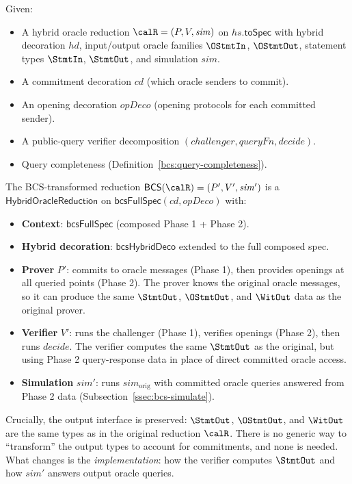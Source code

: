 \begin{definition}
  \label{bcs:bcs-reduction}
  Given:
  \begin{itemize}
    \item A hybrid oracle reduction $\calR = (P, V, \mathit{sim})$ on
      $\mathit{hs}.\mathsf{toSpec}$ with hybrid decoration $\mathit{hd}$,
      input/output oracle families $\OStmtIn$, $\OStmtOut$,
      statement types $\StmtIn$, $\StmtOut$,
      and simulation $\mathit{sim}$.
    \item A commitment decoration $\mathit{cd}$ (which oracle senders to
      commit).
    \item An opening decoration $\mathit{opDeco}$ (opening protocols for
      each committed sender).
    \item A public-query verifier decomposition
      $(\mathit{challenger}, \mathit{queryFn}, \mathit{decide})$.
    \item Query completeness (Definition~\ref{bcs:query-completeness}).
  \end{itemize}
  The BCS-transformed reduction
  $\mathsf{BCS}(\calR) = (P', V', \mathit{sim}')$ is a
  $\mathsf{HybridOracleReduction}$ on
  $\mathsf{bcsFullSpec}(\mathit{cd}, \mathit{opDeco})$ with:
  \begin{itemize}
    \item \textbf{Context}: $\mathsf{bcsFullSpec}$ (composed Phase 1 + Phase 2).
    \item \textbf{Hybrid decoration}: $\mathsf{bcsHybridDeco}$ extended to
      the full composed spec.
    \item \textbf{Prover} $P'$: commits to oracle messages (Phase 1),
      then provides openings at all queried points (Phase 2).
      The prover knows the original oracle messages, so it can produce the
      same $\StmtOut$, $\OStmtOut$, and $\WitOut$ data as the original
      prover.
    \item \textbf{Verifier} $V'$: runs the challenger (Phase 1), verifies
      openings (Phase 2), then runs $\mathit{decide}$.
      The verifier computes the same $\StmtOut$ as the original, but
      using Phase 2 query-response data in place of direct committed oracle
      access.
    \item \textbf{Simulation} $\mathit{sim}'$:
      runs $\mathit{sim}_{\mathrm{orig}}$ with committed oracle queries
      answered from Phase 2 data (Subsection~\ref{ssec:bcs-simulate}).
  \end{itemize}
  Crucially, the output interface is preserved: $\StmtOut$, $\OStmtOut$,
  and $\WitOut$ are the same types as in the original reduction $\calR$.
  There is no generic way to ``transform'' the output types to account for
  commitments, and none is needed.
  What changes is the \emph{implementation}: how the verifier computes
  $\StmtOut$ and how $\mathit{sim}'$ answers output oracle queries.
\end{definition}


